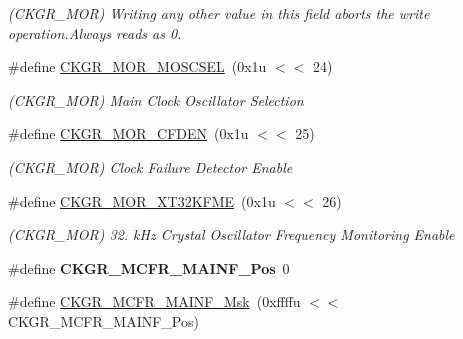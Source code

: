 \begin{DoxyCompactItemize}
\begin{DoxyCompactList}\small\item\em (C\+K\+G\+R\+\_\+\+M\+OR) Writing any other value in this field aborts the write operation.\+Always reads as 0. \end{DoxyCompactList}\item 
\mbox{\label{group__SAMV71__PMC_gaa1d09a0e1aea4606def1a71287833035}} 
\#define \mbox{\hyperlink{group__SAMV71__PMC_gaa1d09a0e1aea4606def1a71287833035}{C\+K\+G\+R\+\_\+\+M\+O\+R\+\_\+\+M\+O\+S\+C\+S\+EL}}~(0x1u $<$$<$ 24)
\begin{DoxyCompactList}\small\item\em (C\+K\+G\+R\+\_\+\+M\+OR) Main Clock Oscillator Selection \end{DoxyCompactList}\item 
\mbox{\label{group__SAMV71__PMC_gadb0661f3af5679f457c07a3a3ace4af4}} 
\#define \mbox{\hyperlink{group__SAMV71__PMC_gadb0661f3af5679f457c07a3a3ace4af4}{C\+K\+G\+R\+\_\+\+M\+O\+R\+\_\+\+C\+F\+D\+EN}}~(0x1u $<$$<$ 25)
\begin{DoxyCompactList}\small\item\em (C\+K\+G\+R\+\_\+\+M\+OR) Clock Failure Detector Enable \end{DoxyCompactList}\item 
\mbox{\label{group__SAMV71__PMC_ga8f908a11bf0b0c5974ae028099037327}} 
\#define \mbox{\hyperlink{group__SAMV71__PMC_ga8f908a11bf0b0c5974ae028099037327}{C\+K\+G\+R\+\_\+\+M\+O\+R\+\_\+\+X\+T32\+K\+F\+ME}}~(0x1u $<$$<$ 26)
\begin{DoxyCompactList}\small\item\em (C\+K\+G\+R\+\_\+\+M\+OR) 32. k\+Hz Crystal Oscillator Frequency Monitoring Enable \end{DoxyCompactList}\item 
\mbox{\label{group__SAMV71__PMC_gad686e71166d30ed77a919900cd438b4b}} 
\#define {\bfseries C\+K\+G\+R\+\_\+\+M\+C\+F\+R\+\_\+\+M\+A\+I\+N\+F\+\_\+\+Pos}~0
\item 
\mbox{\label{group__SAMV71__PMC_ga57b367ae43ea4e0e406c54672607eaf8}} 
\#define \mbox{\hyperlink{group__SAMV71__PMC_ga57b367ae43ea4e0e406c54672607eaf8}{C\+K\+G\+R\+\_\+\+M\+C\+F\+R\+\_\+\+M\+A\+I\+N\+F\+\_\+\+Msk}}~(0xffffu $<$$<$ C\+K\+G\+R\+\_\+\+M\+C\+F\+R\+\_\+\+M\+A\+I\+N\+F\+\_\+\+Pos)

\end{DoxyCompactItemize}
